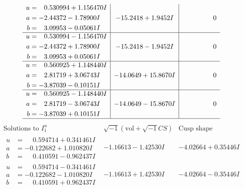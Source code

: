 \documentclass[1p]{elsarticle_modified}
\theoremstyle{definition}
\newcommand{\I}{\sqrt{-1}}
\begin{document}
$$\begin{array}{c|c|c}
\begin{aligned}
u &= \phantom{-}0.530994 + 1.156470 I \\
a &= -2.44372 - 1.78900 I \\
b &= \phantom{-}3.09953 - 0.05061 I\end{aligned}
 & -15.2418 + 1.9452 I & \phantom{-0.000000 } 0 \\ \hline\begin{aligned}
u &= \phantom{-}0.530994 - 1.156470 I \\
a &= -2.44372 + 1.78900 I \\
b &= \phantom{-}3.09953 + 0.05061 I\end{aligned}
 & -15.2418 - 1.9452 I & \phantom{-0.000000 } 0 \\ \hline\begin{aligned}
u &= \phantom{-}0.560925 + 1.148440 I \\
a &= \phantom{-}2.81719 + 3.06743 I \\
b &= -3.87039 - 0.10151 I\end{aligned}
 & -14.0649 + 15.8670 I & \phantom{-0.000000 } 0 \\ \hline\begin{aligned}
u &= \phantom{-}0.560925 - 1.148440 I \\
a &= \phantom{-}2.81719 - 3.06743 I \\
b &= -3.87039 + 0.10151 I\end{aligned}
 & -14.0649 - 15.8670 I & \phantom{-0.000000 } 0\\
 \hline 
 \end{array}$$\newpage$$\begin{array}{c|c|c}  
\text{Solutions to }I^u_{1}& \I (\text{vol} + \sqrt{-1}CS) & \text{Cusp shape}\\
 \hline 
\begin{aligned}
u &= \phantom{-}0.594714 + 0.341461 I \\
a &= -0.122682 + 1.010820 I \\
b &= \phantom{-}0.410591 - 0.962437 I\end{aligned}
 & -1.16613 - 1.42530 I & -4.02664 + 0.35446 I \\ \hline\begin{aligned}
u &= \phantom{-}0.594714 - 0.341461 I \\
a &= -0.122682 - 1.010820 I \\
b &= \phantom{-}0.410591 + 0.962437 I\end{aligned}
 & -1.16613 + 1.42530 I & -4.02664 - 0.35446 I \\ \hline\begin{aligned}

\end{aligned}
\end{array}$$
\end{document}
